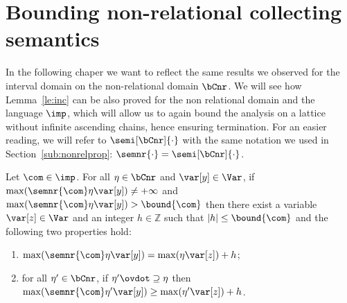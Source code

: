 \section{Bounding non-relational collecting semantics}\label{sec:computingnonrel}

In the following chaper we want to reflect the same results we
observed for the interval domain on the non-relational domain
\(\bCnr\). We will see how Lemma~\ref{le:inc} can be also proved for
the non relational domain and the language \(\imp\), which will allow
us to again bound the analysis on a lattice without infinite ascending
chains, hence ensuring termination.  For an easier reading, we will
refer to \(\semi[\bCnr]{\cdot}\) with the same notation we used in
Section~\ref{sub:nonrelprop}: \(\semnr{\cdot} = \semi[\bCnr]{\cdot}\).

\begin{lemma}\label{le:incnr}
  Let \(\com\in \imp\).
  For all \(\eta \in \bCnr\) and \(\var[y] \in \Var\), if
  \(\max(\semnr{\com} \eta \var[y]) \neq +\infty\) and
  \(\max(\semnr{\com}\eta \var[y]) > \bound{\com}\) then there exist a
  variable \(\var[z] \in \Var\) and an integer \(h \in \mathbb{Z}\)
  such that \(|h| \leq \bound{\com}\) and the following two properties
  hold:
  \begin{enumerate}[label=(\roman*)]
  \item\label{point1nr} \(\max(\semnr{\com}\eta \var[y]) = \max(\eta \var[z]) + h\); 
  \item\label{point2nr} for all \(\eta' \in \bCnr\), if
    \(\eta' \ovdot\supseteq \eta\)
    then
    \(\max(\semnr{\com}\eta' \var[y]) \geq \max(\eta' \var[z]) + h\).
  \end{enumerate}
\end{lemma}


